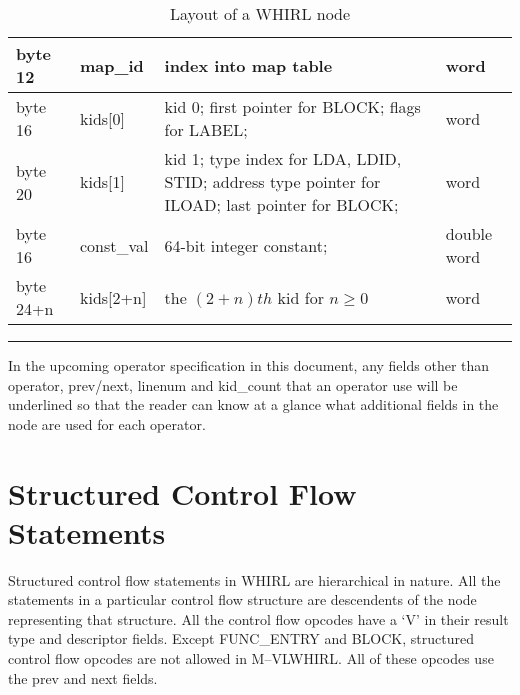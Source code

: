\documentclass{article}
\begin{document}
\begin{table}[h]
\begin{center}
\begin{tabular}{|l|l|p{3in}|l|}
%
byte 12  & map\_id & index into map table & word \\\hline
byte 16 & kids[0] & kid 0; first pointer for
\index{BLOCK}%
BLOCK; flags for LABEL; & word \\\hline
byte 20 & kids[1] & kid 1; type index for
\index{LDA}%
LDA,
\index{LDID}%
LDID,
\index{STID}%
STID; address type pointer for
\index{ILOAD}%
ILOAD; last pointer for
\index{BLOCK}%
BLOCK; & word \\\hline
byte 16  & const\_val & 64-bit integer constant; & double word \\\hline
byte 24+n  & kids[2+n] & the $(2+n)th$ kid for $n \geq 0$ & word \\\hline
\hline
\end{tabular}
\end{center}
\vspace{2ex}
\hrule
\caption{Layout of a WHIRL node}
\label{whirl-node-layout}
\end{table}

In the upcoming operator specification in this document, any fields
other than operator, prev/next, linenum and kid\_count that an operator
use will be underlined so that the reader can know at a glance what
additional fields in the node are used for each operator.

\section{Structured Control Flow Statements}

Structured control flow statements in WHIRL are hierarchical in
nature. All the statements in a particular control flow structure
are descendents of the node representing that structure. All the
control flow opcodes have a `V' in their result type and descriptor
fields. Except 
%
FUNC\_ENTRY and
%
BLOCK, structured control flow opcodes are not
allowed in M--VLWHIRL. All of these opcodes use the prev and next
fields.
\end{document}

